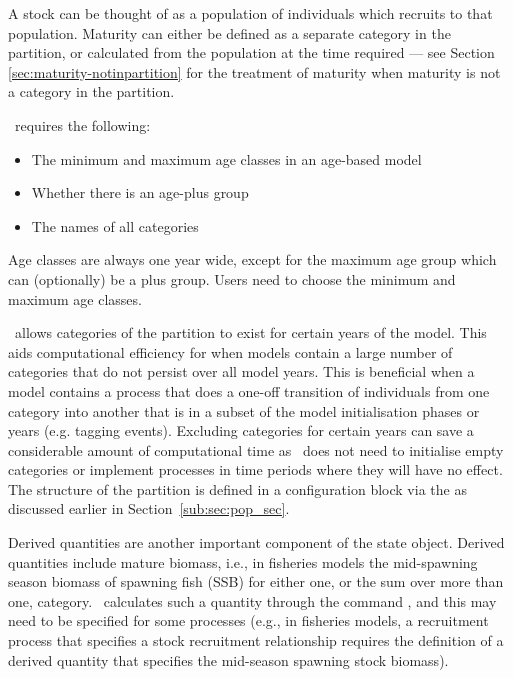 A stock can be thought of as a population of individuals which recruits to that population. Maturity can either be defined as a separate category in the partition, or calculated from the population at the time required --- see Section \ref{sec:maturity-notinpartition} for the treatment of maturity when maturity is not a category in the partition. 

\CNAME\ requires the following: 

\begin{itemize}
\item	The minimum and maximum age classes in an age-based model
\item	Whether there is an age-plus group
\item The names of all categories
\end{itemize}

Age classes are always one year wide, except for the maximum age group which can (optionally) be a plus group. Users need to choose the minimum and maximum age classes. 

\CNAME\ allows categories of the partition to exist for certain years of the model. This aids computational efficiency for when models contain a large number of categories that do not persist over all model years. This is beneficial when a model contains a process that does a one-off transition of individuals from one category into another that is in a subset of the model initialisation phases or years (e.g. tagging events). Excluding categories for certain years can save a considerable amount of computational time as \CNAME\ does not need to initialise empty categories or implement processes in time periods where they will have no effect. The structure of the partition is defined in a configuration block via the  as discussed earlier in Section~\ref{sub:sec:pop_sec}.

Derived quantities are another important component of the state object. Derived quantities include mature biomass, i.e., in fisheries models the mid-spawning season biomass of spawning fish (SSB) for either one, or the sum over more than one, category. \CNAME\ calculates such a quantity through the command , and this may need to be specified for some processes (e.g., in fisheries models, a recruitment process that specifies a stock recruitment relationship requires the definition of a derived quantity that specifies the mid-season spawning stock biomass).

\subsection{}

